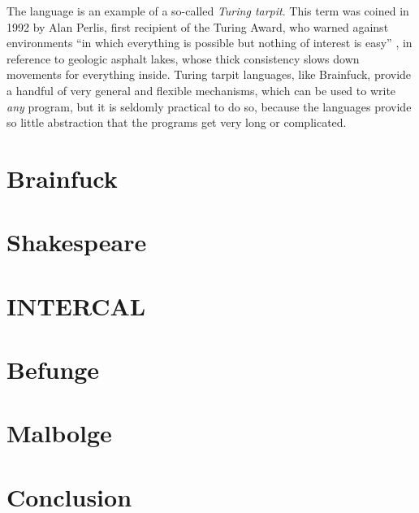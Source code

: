 \documentclass{sig-alternate}
\begin{document}
The language is an example of a so-called \emph{Turing tarpit}. This term was coined in 1992 by Alan Perlis, first recipient of the Turing Award, who warned against environments “in which everything is possible but nothing of interest is easy” \cite{perlis1982epigrams}, in reference to geologic asphalt lakes, whose thick consistency slows down movements for everything inside. Turing tarpit languages, like Brainfuck, provide a handful of very general and flexible mechanisms, which can be used to write \emph{any} program, but it is seldomly practical to do so, because the languages provide so little abstraction that the programs get very long or complicated.

\newpage
\section{Brainfuck}



\newpage
\section{Shakespeare}



\newpage
\section{INTERCAL}



\newpage
\section{Befunge}



\newpage
\section{Malbolge}



\newpage

\section{Conclusion}

\blindtext[5]

\printbibliography
\end{document}
